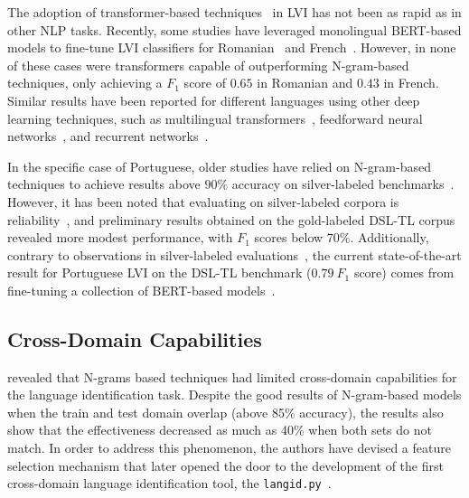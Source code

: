The adoption of transformer-based techniques~\cite{vaswani2017attention} in LVI has not been as rapid as in other NLP tasks. Recently, some studies have leveraged monolingual BERT-based models to fine-tune LVI classifiers for Romanian~\cite{zaharia-etal-2020-exploring} and French~\cite{bernier2022transfer}. However, in none of these cases were transformers capable of outperforming N-gram-based techniques, only achieving a $F_1$ score of $0.65$ in Romanian and $0.43$ in French. Similar results have been reported for different languages using other deep learning techniques, such as multilingual transformers~\cite{popa-stefanescu-2020-applying}, feedforward neural networks~\cite{coltekin-rama-2016-discriminating, medvedeva-etal-2017-sparse}, and recurrent networks~\cite{guggilla-2016-discrimination, ccoltekin2018tubingen}.

In the specific case of Portuguese, older studies have relied on N-gram-based techniques to achieve results above $90\%$ accuracy on silver-labeled benchmarks~\cite{da2006identification, zampieri2012automatic, goutte2014nrc, malmasi-dras-2015-language, castro2016discriminating}. However, it has been noted that evaluating on silver-labeled corpora is reliability~\cite{zampieri2014varclass}, and  preliminary results obtained on the gold-labeled DSL-TL corpus~\cite{zampieri2023language} revealed more modest performance, with $F_1$ scores below $70\%$. Additionally, contrary to observations in silver-labeled evaluations~\cite{medvedeva-etal-2017-sparse}, the current state-of-the-art result for Portuguese LVI on the DSL-TL benchmark ($0.79~F_1$ score) comes from fine-tuning a collection of BERT-based models~\cite{vaidya2023two}.

\subsection{Cross-Domain Capabilities}
\label{subsec:Delexicalization}

\citet{lui2011cross} revealed that N-grams based techniques had limited cross-domain capabilities for the language identification task. Despite the good results of N-gram-based models when the train and test domain overlap (above 85\% accuracy), the results also show that the effectiveness decreased as much as 40\% when both sets do not match. In order to address this phenomenon, the authors have devised a feature selection mechanism that later opened the door to the development of the first cross-domain language identification tool, the \texttt{langid.py}~\cite{lui2012langid}.

